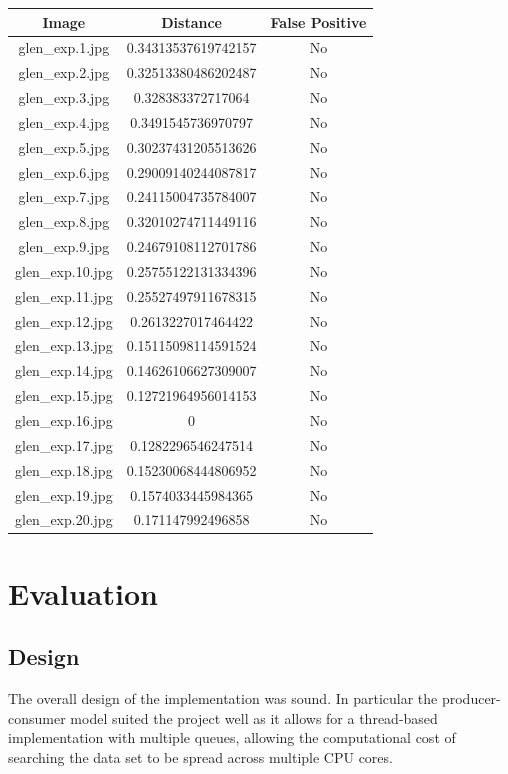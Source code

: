 \documentclass[12pt]{article}
\begin{document}
\begin{center}
\begin{tabular}{ccc}
Image & Distance & False Positive \\
\hline
glen\_exp.1.jpg & 0.34313537619742157 & No \\
glen\_exp.2.jpg & 0.32513380486202487 & No \\
glen\_exp.3.jpg & 0.328383372717064 & No \\
glen\_exp.4.jpg & 0.3491545736970797 & No \\
glen\_exp.5.jpg & 0.30237431205513626 & No \\
glen\_exp.6.jpg & 0.29009140244087817 & No \\
glen\_exp.7.jpg & 0.24115004735784007 & No \\
glen\_exp.8.jpg & 0.32010274711449116 & No \\
glen\_exp.9.jpg & 0.24679108112701786 & No \\
glen\_exp.10.jpg & 0.25755122131334396 & No \\
glen\_exp.11.jpg & 0.25527497911678315 & No \\
glen\_exp.12.jpg & 0.2613227017464422 & No \\
glen\_exp.13.jpg & 0.15115098114591524 & No \\
glen\_exp.14.jpg & 0.14626106627309007 & No \\
glen\_exp.15.jpg & 0.12721964956014153 & No \\
glen\_exp.16.jpg & 0 & No \\
glen\_exp.17.jpg & 0.1282296546247514 & No \\
glen\_exp.18.jpg & 0.15230068444806952 & No \\
glen\_exp.19.jpg & 0.1574033445984365 & No \\
glen\_exp.20.jpg & 0.171147992496858 & No \\
\end{tabular}
\end{center}

\newpage
\section{Evaluation}
\subsection{Design}
The overall design of the implementation was sound. In particular the producer-consumer model suited the project well as it allows for a thread-based implementation with multiple queues, allowing the computational cost of searching the data set to be spread across multiple CPU cores.
\end{document}
